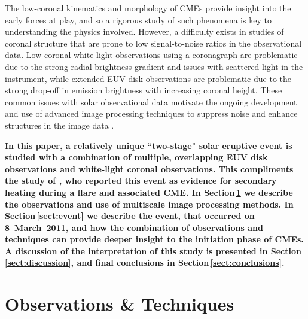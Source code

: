 \documentclass[namedreferences]{solarphysics}
\begin{document}
\begin{article}
The low-coronal kinematics and morphology of CMEs provide insight into the early forces at play, and so a rigorous study of such phenomena is key to understanding the physics involved. However, a difficulty exists in studies of coronal structure that are prone to low signal-to-noise ratios in the observational data. Low-coronal white-light observations using a coronagraph are problematic due to the strong radial brightness gradient and issues with scattered light in the instrument, while extended EUV disk observations are problematic due to the strong drop-off in emission brightness with increasing coronal height. These common issues with solar observational data motivate the ongoing development and use of advanced image processing techniques to suppress noise and enhance structures in the image data \cite{2011ApJ...737...88D,2011igi-global,2008SoPh..248..457Y,2006SoPh..236..263M,2003A&A...398.1185S}. 

{\bf In this paper, a relatively unique ``two-stage" solar eruptive event is studied with a combination of multiple, overlapping EUV disk observations and white-light coronal observations. This compliments the study of , who reported this event as evidence for secondary heating during a flare and associated CME. In Section\,\ref{sect:techniques} we describe the observations and use of multiscale image processing methods. In Section\,\ref{sect:event} we describe the event, that occurred on 8~March~2011, and how the combination of observations and techniques can provide deeper insight to the initiation phase of CMEs. A discussion of the interpretation of this study is presented in Section\,\ref{sect:discussion}, and final conclusions in Section\,\ref{sect:conclusions}.}

\section{Observations \& Techniques}
\label{sect:techniques}



\end{article}
\end{document}
